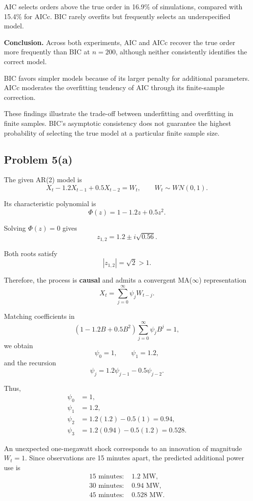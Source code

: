 \documentclass[11pt]{article}
\begin{document}
AIC selects orders above the true
order in 16.9\% of simulations,
compared with 15.4\% for AICc.
BIC rarely overfits but frequently
selects an underspecified model.

\textbf{Conclusion.}
Across both experiments, AIC and AICc
recover the true order more frequently
than BIC at \(n=200\), although neither
consistently identifies the correct model.

BIC favors simpler models because of
its larger penalty for additional
parameters. AICc moderates the
overfitting tendency of AIC through
its finite-sample correction.

These findings illustrate the trade-off
between underfitting and overfitting
in finite samples. BIC's asymptotic
consistency does not guarantee the
highest probability of selecting the
true model at a particular finite
sample size.




\subsection*{Problem 5(a)}

The given AR(2) model is
\[
X_t-1.2X_{t-1}+0.5X_{t-2}=W_t,
\qquad W_t\sim WN(0,1).
\]

Its characteristic polynomial is
\[
\Phi(z)=1-1.2z+0.5z^2.
\]

Solving \(\Phi(z)=0\) gives
\[
z_{1,2}=1.2\pm i\sqrt{0.56}.
\]

Both roots satisfy
\[
|z_{1,2}|=\sqrt{2}>1.
\]

Therefore, the process is \textbf{causal}
and admits a convergent MA(\(\infty\))
representation
\[
X_t=\sum_{j=0}^{\infty}\psi_jW_{t-j}.
\]

Matching coefficients in
\[
(1-1.2B+0.5B^2)
\sum_{j=0}^{\infty}\psi_jB^j=1,
\]
we obtain
\[
\psi_0=1,\qquad
\psi_1=1.2,
\]
and the recursion
\[
\psi_j=1.2\psi_{j-1}-0.5\psi_{j-2}.
\]

Thus,
\[
\begin{aligned}
\psi_0&=\boxed{1},\\
\psi_1&=\boxed{1.2},\\
\psi_2&=1.2(1.2)-0.5(1)
=\boxed{0.94},\\
\psi_3&=1.2(0.94)-0.5(1.2)
=\boxed{0.528}.
\end{aligned}
\]

An unexpected one-megawatt shock corresponds
to an innovation of magnitude \(W_t=1\).
Since observations are 15 minutes apart,
the predicted additional power use is
\[
\boxed{
\begin{aligned}
15\text{ minutes: }&1.2\text{ MW},\\
30\text{ minutes: }&0.94\text{ MW},\\
45\text{ minutes: }&0.528\text{ MW}.
\end{aligned}
}
\]
\end{document}
